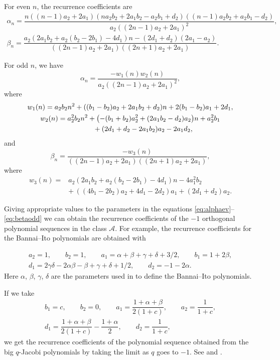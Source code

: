 \documentclass[10pt,a4paper]{amsart}
\def\cA{\mathcal A}
\numberwithin{equation}{section}
\begin{document}
For even $n$, the recurrence coefficients are
\begin{gather}\label{eq:alphaev}
	\alpha_n= \dfrac{n ((n-1)a_2 + 2 a_1) (n a_2 b_2+2 a_1 b_2 -a_2 b_1 + d_2)((n-1) a_2 b_2 + a_2 b_1 -d_2)}{a_2( (2 n-1) a_2 + 2 a_1)^2 },
\\
\label{eq:betaev}
\beta_n= \dfrac{a_2(2 a_1 b_2 +a_2(b_2-2 b_1)-4 d_1) n - (2 d_1+d_2)( 2 a_1 -a_2)}{((2n-1) a_2 + 2 a_1) ((2n+1) a_2 + 2 a_1)}.
\end{gather}

For odd $n$, we have
\begin{equation}\label{eq:alphaodd}
	\alpha_n= \dfrac{-w_1(n) w_2(n) }{a_2( (2 n-1) a_2 + 2 a_1)^2 },
\end{equation}
where
\begin{gather*}
w_1(n)=a_2 b_2 n^2+ ((b_1-b_2) a_2 + 2 a_1 b_2 + d_2) n + 2 (b_1-b_2) a_1 + 2 d_1,\\
w_2(n)=  a_2^2 b_2 n^2 + \bigl(- (b_1+ b_2) a_2^2 + ( 2 a_1 b_2 - d_2) a_2\bigr) n + a_2^2 b_1\\
\hphantom{w_2(n)=}{} + (2 d_1+ d_2- 2 a_1 b_2) a_2 - 2 a_1 d_2,
\end{gather*}
and
\begin{equation}\label{eq:betaodd}
	\beta_n= \dfrac{- w_3(n)}{((2 n-1) a_2 + 2 a_1) ( ( 2 n +1) a_2 + 2 a_1) },
\end{equation}
where
\begin{align*}
w_3(n)={}& a_2( 2 a_1 b_2 + a_2(b_2- 2 b_1)-4 d_1) n - 4 a_1^2 b_2\\
&{+}\,((4 b_1 -2 b_2) a_2 + 4 d_1- 2 d_2) a_1 + ( 2 d_1 + d_2) a_2.
\end{align*}

Giving appropriate values to the parameters in the equations \eqref{eq:alphaev}--\eqref{eq:betaodd} we can obtain the recurrence coefficients of the $-1$ orthogonal polynomial sequences in the class $\cA$. For example, the recurrence coefficients for the Bannai--Ito polynomials \cite{GenVZ} are obtained with

\begin{gather*}
a_2=1,\qquad b_2=1, \qquad a_1=\alpha+\beta +\gamma+ \delta+ 3/2 ,\qquad b_1=1 + 2 \beta, \\
d_1= 2 \gamma \delta -2 \alpha \beta - \beta + \gamma + \delta +1/2 , \qquad d_2=-1- 2 \alpha.
\end{gather*}
Here $\alpha$, $\beta$, $\gamma$, $\delta$ are the parameters used in \cite{GenVZ} to define the Bannai--Ito polynomials.

If we take
\begin{gather*}
b_1=c,\qquad b_2=0,\qquad a_1=\dfrac{1 +\alpha + \beta}{2 ( 1+c)},\qquad a_2=\dfrac{1}{1+c},\\
 d_1=\dfrac{1 +\alpha + \beta}{2 ( 1+c)}-\dfrac{1+\alpha}{2},\qquad d_2= \dfrac{1}{1+c},
 \end{gather*}
we get the recurrence coefficients of the polynomial sequence obtained from the big $q$-Jacobi polynomials by taking the limit as $q$ goes to $-1$. See \cite{CohlCS} and \cite{VZ2}.
\end{document}
